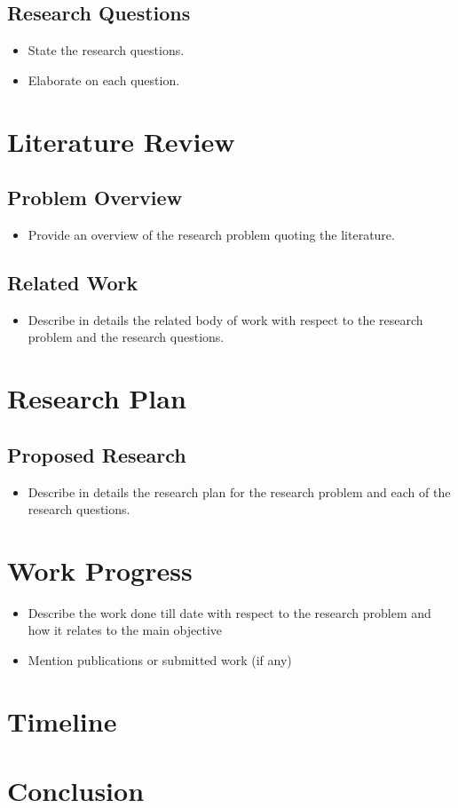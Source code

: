 \documentclass{article}
\begin{document}
\subsection{Research Questions}
\begin{itemize}
 \item State the research questions.
 \item Elaborate on each question.
\end{itemize}


\section{Literature Review}

\subsection{Problem Overview}
\begin{itemize}
 \item Provide an overview of the research problem quoting the literature.
\end{itemize}

\subsection{Related Work}
\begin{itemize}
 \item Describe in details the related body of work with respect to the research problem and the research questions.
\end{itemize}


\section{Research Plan}

\subsection{Proposed Research}
\begin{itemize}
 \item Describe in details the research plan for the research problem and each of the research questions.
\end{itemize}


\section{Work Progress}
\begin{itemize}
 \item Describe the work done till date with respect to the research problem and how it relates to the main objective
 \item Mention publications or submitted work (if any)
\end{itemize}


\section{Timeline}


\section{Conclusion}
\end{document}
